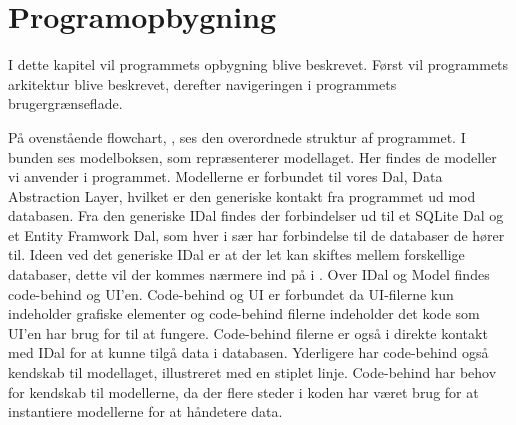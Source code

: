 \chapter{Programopbygning}

I dette kapitel vil programmets opbygning blive beskrevet. Først vil programmets arkitektur blive beskrevet, derefter navigeringen i programmets brugergrænseflade.


På ovenstående flowchart, , ses den overordnede struktur af programmet.
I bunden ses modelboksen, som repræsenterer modellaget.
Her findes de modeller vi anvender i programmet.
Modellerne er forbundet til vores Dal, Data Abstraction Layer, hvilket er den generiske kontakt fra programmet ud mod databasen.
Fra den generiske IDal findes der forbindelser ud til et SQLite Dal og et Entity Framwork Dal, som hver i sær har forbindelse til de databaser de hører til.
Ideen ved det generiske IDal er at der let kan skiftes mellem forskellige databaser, dette vil der kommes nærmere ind på i .
Over IDal og Model findes code-behind og UI'en.
Code-behind og UI er forbundet da UI-filerne kun indeholder grafiske elementer og code-behind filerne indeholder det kode som UI'en har brug for til at fungere.
Code-behind filerne er også i direkte kontakt med IDal for at kunne tilgå data i databasen.
Yderligere har code-behind også kendskab til modellaget, illustreret med en stiplet linje.
Code-behind har behov for kendskab til modellerne, da der flere steder i koden har været brug for at instantiere modellerne for at håndetere data. 

